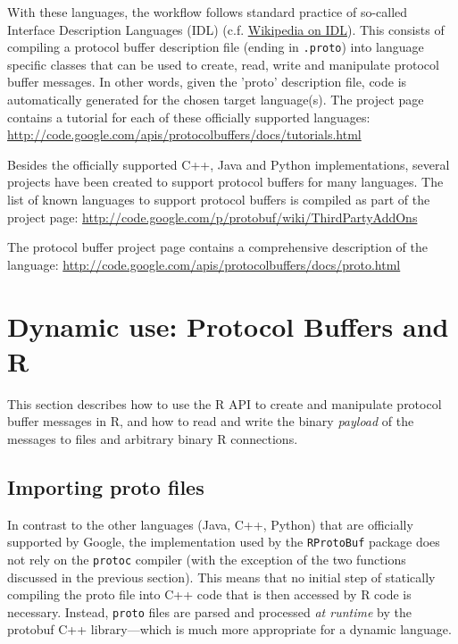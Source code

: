 With these languages, the workflow follows standard practice of so-called
Interface Description Languages (IDL)
(c.f. \href{http://en.wikipedia.org/wiki/Interface_description_language}{Wikipedia
  on IDL}).  This consists of compiling a protocol buffer description file
(ending in \texttt{.proto}) into language specific classes that can be used
to create, read, write and manipulate protocol buffer messages. In other
words, given the 'proto' description file, code is automatically generated
for the chosen target language(s). The project page contains a tutorial for
each of these officially supported languages:
\url{http://code.google.com/apis/protocolbuffers/docs/tutorials.html}

Besides the officially supported C++, Java and Python implementations, several projects have been
created to support protocol buffers for many languages. The list of known
languages to support protocol buffers is compiled as part of the
project page: \url{http://code.google.com/p/protobuf/wiki/ThirdPartyAddOns}

The protocol buffer project page contains a comprehensive
description of the language: \url{http://code.google.com/apis/protocolbuffers/docs/proto.html}

%

\section{Dynamic use: Protocol Buffers and R}

This section describes how to use the R API to create and manipulate
protocol buffer messages in R, and how to read and write the
binary \emph{payload} of the messages to files and arbitrary binary
R connections.

\subsection{Importing proto files}

In contrast to the other languages (Java, C++, Python) that are officially
supported by Google, the implementation used by the \texttt{RProtoBuf}
package does not rely on the \texttt{protoc} compiler (with the exception of
the two functions discussed in the previous section). This means that no
initial step of statically compiling the proto file into C++ code that is
then accessed by R code is necessary. Instead, \texttt{proto} files are
parsed and processed \textsl{at runtime} by the protobuf C++ library---which
is much more appropriate for a dynamic language.

